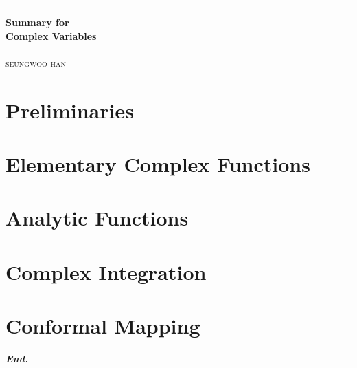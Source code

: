 \documentclass[a4paper,12pt]{report}
\begin{document}

\begin{titlepage}
	\raggedleft

	\rule{1pt}{\textheight}
	\hspace{0.05\textwidth}
	\parbox[b]{0.75\textwidth}{

        {\Huge\bfseries Summary for\\[0.5\baselineskip] Complex Variables }\\[2\baselineskip]
		\\[4\baselineskip]
		{\Large\textsc{seungwoo han}}

		\vspace{0.5\textheight}

	}
\end{titlepage}
\tableofcontents
\hypersetup{
    linkcolor=Maroon,
    filecolor=black,
    urlcolor=Maroon,
}
\pagebreak


\chapter{Preliminaries}




\chapter{Elementary Complex Functions}





\chapter{Analytic Functions}


\chapter{Complex Integration}

\chapter{Conformal Mapping}

\vfill
\begin{center}
    \textbf{\textit{End.}}
\end{center}
\end{document}
